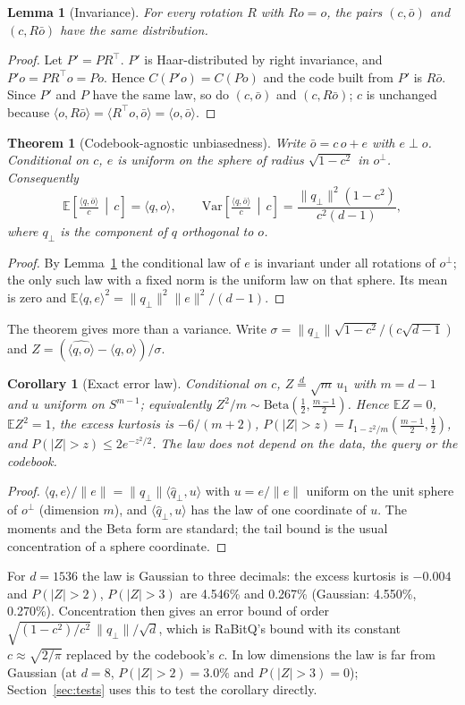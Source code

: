 \documentclass[fleqn,10pt]{wlscirep}
\newtheorem{lemma}{Lemma}
\newtheorem{theorem}{Theorem}
\newtheorem{corollary}{Corollary}
\begin{document}
\begin{lemma}[Invariance]\label{lem:inv}
For every rotation $R$ with $Ro=o$, the pairs $(c,\bar o)$ and $(c,R\bar o)$ have the same distribution.
\end{lemma}
\begin{proof}
Let $P'=PR^\top$. $P'$ is Haar-distributed by right invariance, and $P'o=PR^\top o=Po$. Hence $C(P'o)=C(Po)$ and the code built from $P'$ is $R\bar o$. Since $P'$ and $P$ have the same law, so do $(c,\bar o)$ and $(c,R\bar o)$; $c$ is unchanged because $\langle o,R\bar o\rangle=\langle R^\top o,\bar o\rangle=\langle o,\bar o\rangle$.
\end{proof}

\begin{theorem}[Codebook-agnostic unbiasedness]\label{thm:main}
Write $\bar o=c\,o+e$ with $e\perp o$. Conditional on $c$, $e$ is uniform on the sphere of radius $\sqrt{1-c^2}$ in $o^\perp$. Consequently
\[
\mathbb{E}\!\left[\tfrac{\langle q,\bar o\rangle}{c}\,\middle|\,c\right]=\langle q,o\rangle,\qquad
\mathrm{Var}\!\left[\tfrac{\langle q,\bar o\rangle}{c}\,\middle|\,c\right]=\frac{\|q_\perp\|^2(1-c^2)}{c^2(d-1)},
\]
where $q_\perp$ is the component of $q$ orthogonal to $o$.
\end{theorem}
\begin{proof}
By Lemma~\ref{lem:inv} the conditional law of $e$ is invariant under all rotations of $o^\perp$; the only such law with a fixed norm is the uniform law on that sphere. Its mean is zero and $\mathbb{E}\langle q,e\rangle^2=\|q_\perp\|^2\|e\|^2/(d-1)$.
\end{proof}

The theorem gives more than a variance. Write $\sigma=\|q_\perp\|\sqrt{1-c^2}/(c\sqrt{d-1})$ and $Z=(\widehat{\langle q,o\rangle}-\langle q,o\rangle)/\sigma$.
\begin{corollary}[Exact error law]\label{cor:law}
Conditional on $c$, $Z\stackrel{d}{=}\sqrt{m}\,u_1$ with $m=d-1$ and $u$ uniform on $S^{m-1}$; equivalently $Z^2/m\sim\mathrm{Beta}(\tfrac12,\tfrac{m-1}{2})$. Hence $\mathbb{E}Z=0$, $\mathbb{E}Z^2=1$, the excess kurtosis is $-6/(m+2)$, $P(|Z|>z)=I_{1-z^2/m}\!\left(\tfrac{m-1}{2},\tfrac12\right)$, and $P(|Z|>z)\le 2e^{-z^2/2}$. The law does not depend on the data, the query or the codebook.
\end{corollary}
\begin{proof}
$\langle q,e\rangle/\|e\|=\|q_\perp\|\langle \hat q_\perp,u\rangle$ with $u=e/\|e\|$ uniform on the unit sphere of $o^\perp$ (dimension $m$), and $\langle \hat q_\perp,u\rangle$ has the law of one coordinate of $u$. The moments and the Beta form are standard; the tail bound is the usual concentration of a sphere coordinate.
\end{proof}
For $d=1536$ the law is Gaussian to three decimals: the excess kurtosis is $-0.004$ and $P(|Z|>2)$, $P(|Z|>3)$ are 4.546\% and 0.267\% (Gaussian: 4.550\%, 0.270\%). Concentration then gives an error bound of order $\sqrt{(1-c^2)/c^2}\,\|q_\perp\|/\sqrt d$, which is RaBitQ's bound with its constant $c\approx\sqrt{2/\pi}$ replaced by the codebook's $c$. In low dimensions the law is far from Gaussian (at $d=8$, $P(|Z|>2)=3.0\%$ and $P(|Z|>3)=0$); Section~\ref{sec:tests} uses this to test the corollary directly.
\end{document}
